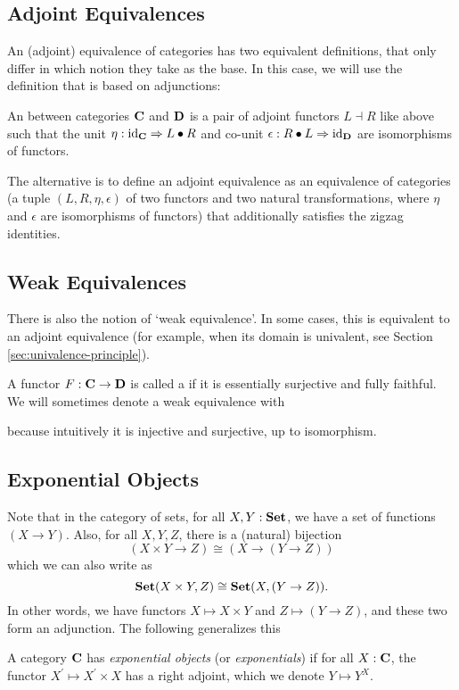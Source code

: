 \subsection{Adjoint Equivalences}
An (adjoint) equivalence of categories has two equivalent definitions, that only differ in which notion they take as the base. In this case, we will use the definition that is based on adjunctions:
\begin{definition}\label{def:equivalence-of-categories}
  An  between categories $ \mathbf{C} $ and $ \mathbf{D} $ is a pair of adjoint functors $ L \dashv R $ like above such that the unit $ \eta: \text{id}_{\mathbf{C}} \Rightarrow L \bullet R $ and co-unit $ \epsilon: R \bullet L \Rightarrow \text{id}_{\mathbf{D}} $ are isomorphisms of functors.
\end{definition}

The alternative is to define an adjoint equivalence as an equivalence of categories (a tuple $ (L, R, \eta, \epsilon) $ of two functors and two natural transformations, where $ \eta $ and $ \epsilon $ are isomorphisms of functors) that additionally satisfies the zigzag identities.

\subsection{Weak Equivalences}
There is also the notion of `weak equivalence'. In some cases, this is equivalent to an adjoint equivalence (for example, when its domain is univalent, see Section \ref{sec:univalence-principle}).
\begin{definition}
  A functor $ F: \mathbf{C} \to \mathbf{D} $ is called a  if it is essentially surjective and fully faithful. We will sometimes denote a weak equivalence with
  \begin{center}
  \end{center}
  because intuitively it is injective and surjective, up to isomorphism.
\end{definition}

\subsection{Exponential Objects}
Note that in the category of sets, for all $ X, Y: \mathbf{Set} $, we have a set of functions $ (X \to Y) $. Also, for all $ X, Y, Z $, there is a (natural) bijection
\[ (X \times Y \to Z) \cong (X \to (Y \to Z)) \]
which we can also write as
\[ \mathbf{Set}(X \times Y, Z) \cong \mathbf{Set}(X, (Y \to Z)). \]
In other words, we have functors $ X \mapsto X \times Y $ and $ Z \mapsto (Y \to Z) $, and these two form an adjunction. The following generalizes this
\begin{definition}
  A category $ \mathbf{C} $ has \textit{exponential objects} (or \textit{exponentials}) if for all $ X: \mathbf{C} $, the functor $ X^\prime \mapsto X^\prime \times X $ has a right adjoint, which we denote $ Y \mapsto Y^X $.
\end{definition}

